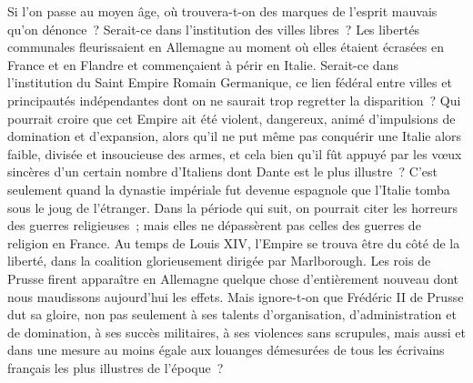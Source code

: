 \documentclass[french,twoside]{book} %
\begin{document}
Si l'on passe au moyen âge, où trouvera-t-on des marques de l'esprit mauvais qu'on dénonce ? Serait-ce dans l'institution des villes libres ? Les libertés communales fleurissaient en Allemagne au moment où elles étaient écrasées en France et en Flandre et commençaient à périr en Italie. Serait-ce dans l'institution du Saint Empire Romain Germanique, ce lien fédéral entre villes et principautés indépendantes dont on ne saurait trop regretter la disparition ? Qui pourrait croire que cet Empire ait été violent, dangereux, animé d'impulsions de domination et d'expansion, alors qu'il ne put même pas conquérir une Italie alors faible, divisée et insoucieuse des armes, et cela bien qu'il fût appuyé par les vœux sincères d'un certain nombre d'Italiens dont Dante est le plus illustre ? C'est seulement quand la dynastie impériale fut devenue espagnole que l'Italie tomba sous le joug de l'étranger. Dans la période qui suit, on pourrait citer les horreurs des guerres religieuses ; mais elles ne dépassèrent pas celles des guerres de religion en France. Au temps de Louis XIV, l'Empire se trouva être du côté de la liberté, dans la coalition glorieusement dirigée par Marlborough. Les rois de Prusse firent apparaître en Allemagne quelque chose d'entièrement nouveau dont nous maudissons aujourd'hui les effets. Mais ignore-t-on que Frédéric II de Prusse dut sa gloire, non pas seulement à ses talents d'organisation, d'administration et de domi­nation, à ses succès militaires, à ses violences sans scrupules, mais aussi et dans une mesure au moins égale aux louanges démesurées de tous les écrivains français les plus illustres de l'époque ?\par
\end{document}
